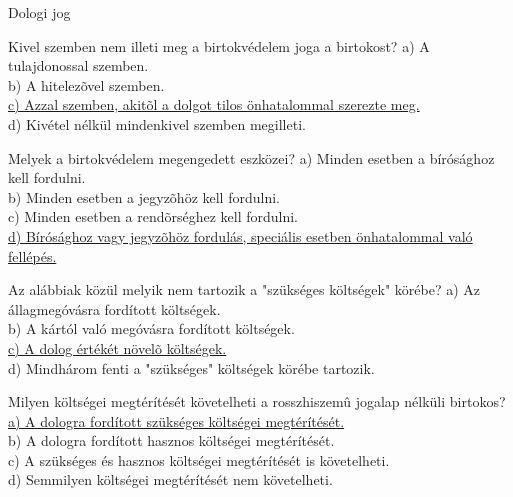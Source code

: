 \begin{frame}[plain]
\begin{tcolorbox}[center, colback={myyellow}, coltext={black}, colframe={myyellow}]
    { Dologi jog}\\
\end{tcolorbox}
\end{frame}

\begin{frame}


\begin{tcolorbox}[title={111. Kérdés}]
Kivel szemben nem illeti meg a birtokvédelem joga a birtokost?
\tcblower
a) A tulajdonossal szemben.\\
b) A hitelezõvel szemben.\\
\uline {c) Azzal szemben, akitõl a dolgot tilos önhatalommal szerezte meg.}\\
d) Kivétel nélkül mindenkivel szemben megilleti.
\end{tcolorbox}

\begin{tcolorbox}[title={112. Kérdés}]
Melyek a birtokvédelem megengedett eszközei?
\tcblower
a) Minden esetben a bírósághoz kell fordulni.\\
b) Minden esetben a jegyzõhöz kell fordulni.\\
c) Minden esetben a rendõrséghez kell fordulni.\\
\uline {d) Bírósághoz vagy jegyzõhöz fordulás, speciális esetben önhatalommal való fellépés.}
\end{tcolorbox}

\begin{tcolorbox}[title={113. Kérdés}]
Az alábbiak közül melyik nem tartozik a "szükséges költségek" körébe?
\tcblower
a) Az állagmegóvásra fordított költségek.\\
b) A kártól való megóvásra fordított költségek.\\
\uline {c) A dolog értékét növelõ költségek.}\\
d) Mindhárom fenti a "szükséges" költségek körébe tartozik.
\end{tcolorbox}

\begin{tcolorbox}[title={114. Kérdés}]
Milyen költségei megtérítését követelheti a rosszhiszemû jogalap nélküli birtokos?
\tcblower
\uline {a) A dologra fordított szükséges költségei megtérítését.}\\
b) A dologra fordított hasznos költségei megtérítését.\\
c) A szükséges és hasznos költségei megtérítését is követelheti.\\
d) Semmilyen költségei megtérítését nem követelheti.
\end{tcolorbox}

\end{frame}


